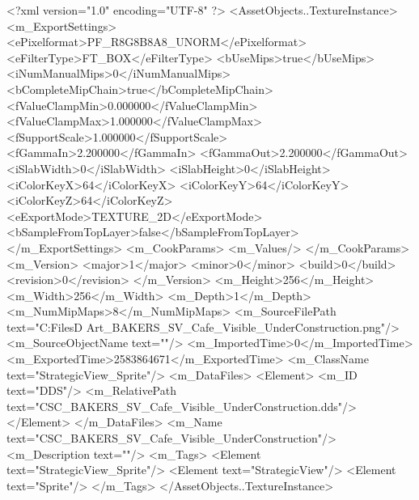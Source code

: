 <?xml version="1.0" encoding="UTF-8" ?>
<AssetObjects..TextureInstance>
	<m_ExportSettings>
		<ePixelformat>PF_R8G8B8A8_UNORM</ePixelformat>
		<eFilterType>FT_BOX</eFilterType>
		<bUseMips>true</bUseMips>
		<iNumManualMips>0</iNumManualMips>
		<bCompleteMipChain>true</bCompleteMipChain>
		<fValueClampMin>0.000000</fValueClampMin>
		<fValueClampMax>1.000000</fValueClampMax>
		<fSupportScale>1.000000</fSupportScale>
		<fGammaIn>2.200000</fGammaIn>
		<fGammaOut>2.200000</fGammaOut>
		<iSlabWidth>0</iSlabWidth>
		<iSlabHeight>0</iSlabHeight>
		<iColorKeyX>64</iColorKeyX>
		<iColorKeyY>64</iColorKeyY>
		<iColorKeyZ>64</iColorKeyZ>
		<eExportMode>TEXTURE_2D</eExportMode>
		<bSampleFromTopLayer>false</bSampleFromTopLayer>
	</m_ExportSettings>
	<m_CookParams>
		<m_Values/>
	</m_CookParams>
	<m_Version>
		<major>1</major>
		<minor>0</minor>
		<build>0</build>
		<revision>0</revision>
	</m_Version>
	<m_Height>256</m_Height>
	<m_Width>256</m_Width>
	<m_Depth>1</m_Depth>
	<m_NumMipMaps>8</m_NumMipMaps>
	<m_SourceFilePath text="C:\Users\Shadow\Desktop\Working Files\2D Art\Quarters\Bakers\StrategicView\CSC_BAKERS_SV_Cafe_Visible_UnderConstruction.png"/>
	<m_SourceObjectName text=""/>
	<m_ImportedTime>0</m_ImportedTime>
	<m_ExportedTime>2583864671</m_ExportedTime>
	<m_ClassName text="StrategicView_Sprite"/>
	<m_DataFiles>
		<Element>
			<m_ID text="DDS"/>
			<m_RelativePath text="CSC_BAKERS_SV_Cafe_Visible_UnderConstruction.dds"/>
		</Element>
	</m_DataFiles>
	<m_Name text="CSC_BAKERS_SV_Cafe_Visible_UnderConstruction"/>
	<m_Description text=""/>
	<m_Tags>
		<Element text="StrategicView_Sprite"/>
		<Element text="StrategicView"/>
		<Element text="Sprite"/>
	</m_Tags>
</AssetObjects..TextureInstance>

